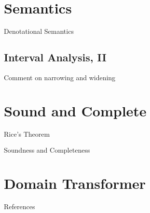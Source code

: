 \documentclass[
   aspectratio=169, %
   10pt, %
   uniqueslidenumber,
   professionalfonts
]{beamer}
\begin{document}
\section{Semantics}

\begin{frame}{\insertsection}
   
\end{frame}

\begin{frame}{Denotational Semantics}
   
\end{frame}

\subsection{Interval Analysis, II}
\begin{frame}{\insertsubsection}
   
   Comment on narrowing and widening
\end{frame}

\section{Sound and Complete}
\begin{frame}{Rice's Theorem}
   
\end{frame}

\begin{frame}{Soundness and Completeness}
   
\end{frame}


   


\section{Domain Transformer}
\begin{frame}{\insertsection}
   
\end{frame}






\renewcommand*{\bibfont}{\tiny}

\AtBeginSection{}
\begin{frame}[allowframebreaks]{References}
   \printbibliography[title={}] %
\end{frame}
\end{document}
